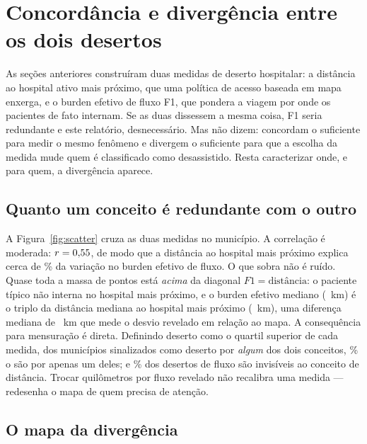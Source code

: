 
\section{Concordância e divergência entre os dois desertos}
\label{sec:divergencia}

As seções anteriores construíram duas medidas de deserto hospitalar: a distância
ao hospital ativo mais próximo, que uma política de acesso baseada em mapa
enxerga, e o burden efetivo de fluxo F1, que pondera a viagem por onde os
pacientes de fato internam. Se as duas dissessem a mesma coisa, F1 seria
redundante e este relatório, desnecessário. Mas não dizem: concordam o
suficiente para medir o mesmo fenômeno e divergem o suficiente para que a escolha
da medida mude quem é classificado como desassistido. Resta caracterizar onde, e
para quem, a divergência aparece.

\subsection{Quanto um conceito é redundante com o outro}

A Figura~\ref{fig:scatter} cruza as duas medidas no município. A correlação é
moderada: $r = 0{,}55$, de modo que a distância ao hospital mais próximo
explica cerca de \valRtwoFD\% da variação no burden efetivo de fluxo.%
O que sobra não é ruído. Quase toda a massa de pontos está \emph{acima} da
diagonal $F1 = \text{distância}$: o paciente típico não interna no hospital mais
próximo, e o burden efetivo mediano (\valMedF~km) é o triplo da distância mediana
ao hospital mais próximo (\valMedIso~km), uma diferença mediana de \valMedGap~km
que mede o desvio revelado em relação ao mapa.%
A consequência para mensuração é direta. Definindo deserto como o quartil
superior de cada medida, dos municípios sinalizados como deserto por
\emph{algum} dos dois conceitos, \valPctDisagree\% o são por apenas um deles; e
\valPctFlowMissed\% dos desertos de fluxo são invisíveis ao conceito de
distância.%
Trocar quilômetros por fluxo revelado não recalibra uma medida --- redesenha o
mapa de quem precisa de atenção.

\subsection{O mapa da divergência}


